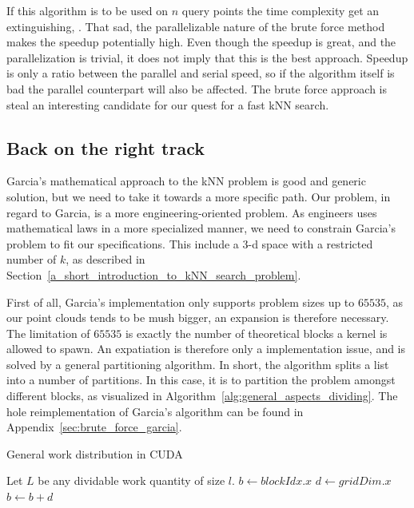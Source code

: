 If this algorithm is to be used on $n$ query points the time complexity get an extinguishing, . That sad, the parallelizable nature of the brute force method makes the speedup potentially high. Even though the speedup is great, and the parallelization is trivial, it does not imply that this is the best approach. Speedup is only a ratio between the parallel and serial speed, so if the algorithm itself is bad the parallel counterpart will also be affected. The brute force approach is steal an interesting candidate for our quest for a fast kNN search.


\subsection{Back on the right track} %
\label{sub:back_on_the_right_rrack}


Garcia's mathematical approach to the kNN problem is good and generic solution, but we need to take it towards a more specific path. Our problem, in regard to Garcia, is a more engineering-oriented problem. As engineers uses mathematical laws in a more specialized manner, we need to constrain Garcia's problem to fit our specifications. This include a 3-d space with a restricted number of $k$, as described in Section~\ref{a_short_introduction_to_kNN_search_problem}.



First of all, Garcia's implementation only supports problem sizes up to $65535$, as our point clouds tends to be mush bigger, an expansion is therefore necessary. The limitation of $65535$ is exactly the number of theoretical blocks a kernel is allowed to spawn. An expatiation is therefore only a implementation issue, and is solved by a general partitioning algorithm. In short, the algorithm splits a list into a number of partitions. In this case, it is to partition the problem amongst different blocks, as visualized in Algorithm~\ref{alg:general_aspects_dividing}. The hole reimplementation of Garcia's algorithm can be found in Appendix~\ref{sec:brute_force_garcia}.

\begin{algorithm}[ht]
\caption{General work distribution in CUDA}
\label{alg:general_aspects_dividing}
\begin{algorithmic}
\State Let $L$ be any dividable work quantity of size $l$.
    \State $b \gets blockIdx.x$ 
    \State $d \gets gridDim.x$ 
    \State {}
    \State $b \gets b + d$
    \EndWhile
    \EndFunction
\end{algorithmic}
\end{algorithm}


